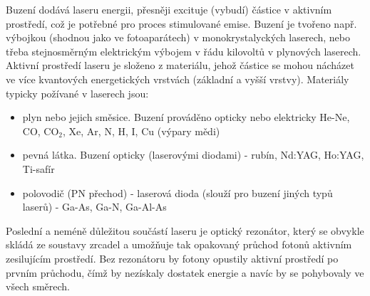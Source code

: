 \documentclass[a4paper,12pt]{article}
\begin{document}
Buzení dodává laseru energii, přesněji excituje (vybudí) částice v aktivním prostředí, což je potřebné pro proces stimulované emise. Buzení je tvořeno např. výbojkou (shodnou jako ve fotoaparátech) v monokrystalyckých laserech, nebo třeba stejnosměrným elektrickým výbojem v řádu kilovoltů v plynových laserech. Aktivní prostředí laseru je složeno z materiálu, jehož částice se mohou nácházet ve více kvantových energetických vrstvách (základní a vyšší vrstvy). 
Materiály typicky požívané v laserech jsou:
\begin{itemize}
\item plyn nebo jejich směsice. Buzení prováděno opticky nebo elektricky He-Ne, CO, CO$_2$, Xe, Ar, N, H, I, Cu (výpary mědi)
\item pevná látka. Buzení opticky (laserovými diodami) - rubín, Nd:YAG, Ho:YAG, Ti-safír
\item polovodič (PN přechod) - laserová dioda (slouží pro buzení jiných typů laserů) - Ga-As, Ga-N, Ga-Al-As
    \end{itemize}

Poslední a neméně důležitou součástí laseru je optický rezonátor, který se obvykle skládá ze soustavy zrcadel a umožňuje tak opakovaný průchod fotonů aktivním zesilujícím prostředí. Bez rezonátoru by fotony opustily aktivní prostředí po prvním průchodu, čímž by nezískaly dostatek energie a navíc by se pohybovaly ve všech směrech.
\end{document}
